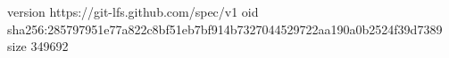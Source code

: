 version https://git-lfs.github.com/spec/v1
oid sha256:285797951e77a822c8bf51eb7bf914b7327044529722aa190a0b2524f39d7389
size 349692
